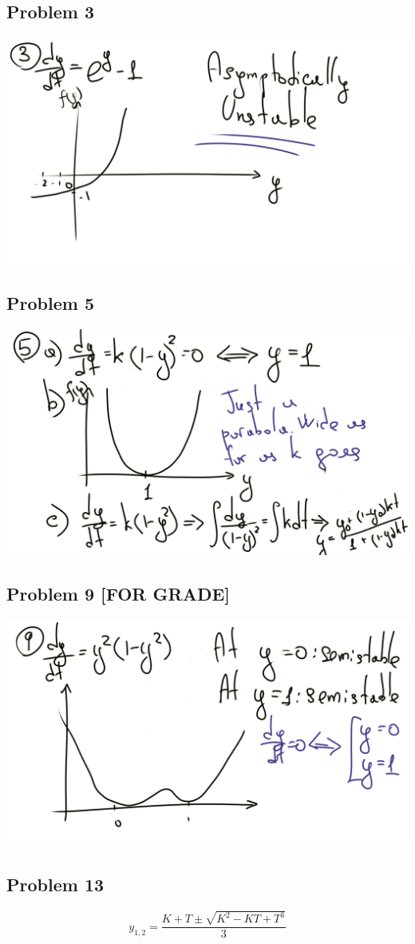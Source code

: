 \documentclass[12pt]{article}
\begin{document}
\subsection*{Problem 3}
\label{sec:orgf146454}
\begin{center}
\includegraphics[width=.9\linewidth]{./d3.png}
\end{center}
\subsection*{Problem 5}
\label{sec:org5f8cb39}
\begin{center}
\includegraphics[width=.9\linewidth]{./d5.png}
\end{center}
\subsection*{Problem 9 [FOR GRADE]}
\label{sec:org0d49c64}
\begin{center}
\includegraphics[width=.9\linewidth]{./d9.png}
\end{center}
\subsection*{Problem 13}
\label{sec:org8fd962a}
\begin{equation*}
  y_{1,2} = \frac{K + T \pm \sqrt{K^2 - KT + T^3}}{3}
\end{equation*}
\end{document}
